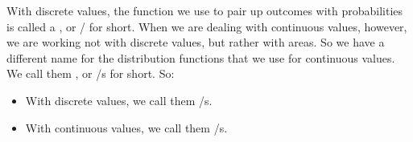 \documentclass[../../../main.tex]{subfiles}
\begin{document}
\noindent
With discrete values, the function we use to pair up outcomes with probabilities is called a , or \PDFtext/ for short. When we are dealing with continuous values, however, we are working not with discrete values, but rather with areas. So we have a different name for the distribution functions that we use for continuous values. We call them , or \CDFtext/s for short. So:

\begin{itemize}
  \item With discrete values, we call them \PDFtext/s.
  \item With continuous values, we call them \CDFtext/s.
\end{itemize}
\end{document}
